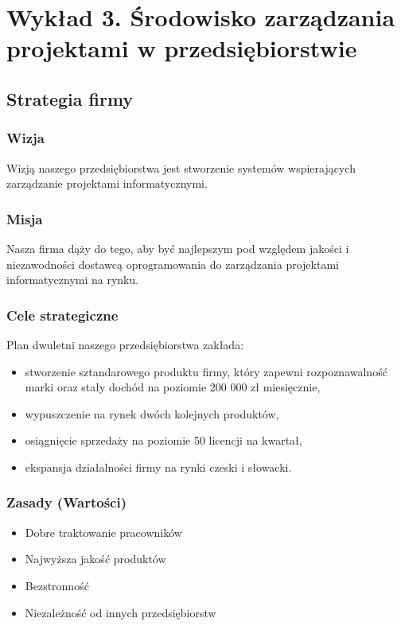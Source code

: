 \chapter{Wykład 3. Środowisko zarządzania projektami w przedsiębiorstwie}

\section{Strategia firmy}

\subsection*{Wizja}

Wizją naszego przedsiębiorstwa jest stworzenie systemów wspierających zarządzanie projektami informatycznymi.

\subsection*{Misja}

Nasza firma dąży do tego, aby być najlepszym pod względem jakości i niezawodności dostawcą oprogramowania do zarządzania projektami informatycznymi na rynku.

\subsection*{Cele strategiczne}

Plan dwuletni naszego przedsiębiorstwa zakłada:
\begin{itemize}
\item stworzenie sztandarowego produktu firmy, który zapewni rozpoznawalność marki oraz stały dochód na poziomie 200 000 zł miesięcznie,
\item wypuszczenie na rynek dwóch kolejnych produktów,
\item osiągnięcie sprzedaży na poziomie 50 licencji na kwartał,
\item ekspansja działalności firmy na rynki czeski i słowacki.
\end{itemize}

\subsection*{Zasady (Wartości)}

\begin{itemize}
\item Dobre traktowanie pracowników
\item Najwyższa jakość produktów
\item Bezstronność
\item Niezależność od innych przedsiębiorstw
\end{itemize}


